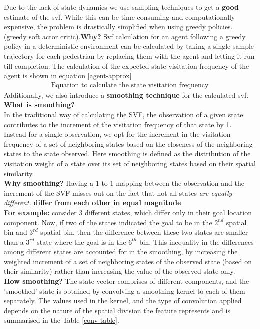 Due to the lack of state dynamics we use sampling techniques to get a \textbf{good} estimate of the svf. While this can be time consuming and computationally expensive, the problem is drastically simplified when using greedy policies. (greedy soft actor critic).\textbf{Why?} 
Svf calculation for an agent following a greedy policy in a deterministic environment can be calculated by taking a single sample trajectory for each pedestrian by replacing them with the agent and letting it run till completion. The calculation of the expected state visitation frequency of the agent is shown in equation \ref{agent-approx}
\begin{align}
\label{agent-approx}
\text{Equation to calculate the state visitation frequency}
\end{align}
Additionally, we also introduce a \textbf{smoothing technique} for the calculated svf. \\
\textbf{What is smoothing?}\\
In the traditional way of calculating the SVF, the observation of a given state contributes to the increment of the visitation frequency of that state by 1. 
Instead for a single observation, we opt for the increment in the visitation frequency of a set of neighboring states based on the closeness of the neighboring states to the state observed. Here smoothing is defined as the distribution of the visitation weight of a state over its set of neighboring states based on their spatial similarity.\\
\textbf{Why smoothing?}
Having a 1 to 1 mapping between the observation and the increment of the SVF misses out on the fact that not all states \textit{are equally different.} \textbf{differ from each other in equal magnitude} \\
\textbf{For example:} consider 3 different states, which differ only in their goal location component. Now, if two of the states indicated the goal to be in the $2^{nd}$ spatial bin and $3^{rd}$ spatial bin, then the difference between these two states are smaller than a $3^{rd}$ state where the goal is in the $6^{th}$ bin.
This inequality in the differences among different states are accounted for in the smoothing, by increasing the weighted increment of a set of neighboring states of the observed state (based on their similarity) rather than increasing the value of the observed state only. \\ 
\textbf{How smoothing?}
The state vector comprises of different components, and the 'smoothed' state is obtained by convolving a smoothing kernel to each of them separately. The values used in the kernel, and the type of convolution applied depends on the nature of the spatial division the feature represents and is summarised in the Table \ref{conv-table}.


